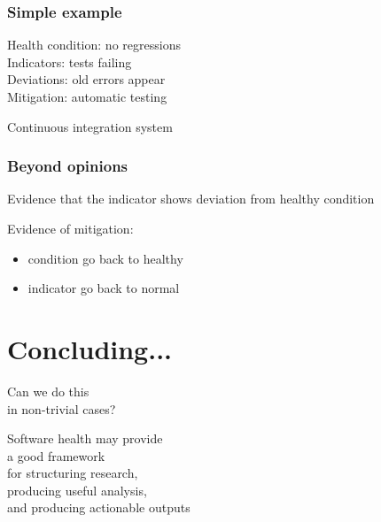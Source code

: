 \documentclass[17pt,aspectratio=169,hyperref=pdfusetitle]{beamer}
\begin{document}
\begin{frame}[fragile]
  \frametitle{Simple example}

  Health condition: no regressions \\
  Indicators: tests failing \\
  Deviations: old errors appear \\
  Mitigation: automatic testing \\

  \begin{center}
    Continuous integration system
  \end{center}
\end{frame}

\begin{frame}[fragile]
  \frametitle{Beyond opinions}

  Evidence that the indicator shows
  deviation from healthy condition

  \vspace{.5cm}
  
  Evidence of mitigation:

  \begin{itemize}
  \item condition go back to healthy
  \item indicator go back to normal
  \end{itemize}
  
\end{frame}

\section{Concluding...}

\begin{frame}[fragile]

  {\Large
  \begin{center}
    Can we do this \\
    in non-trivial cases?
  \end{center}
  }
  
\end{frame}

\begin{frame}[fragile]

  {\large
  \begin{center}
    Software health may provide \\
    a good framework \\
    for structuring research, \\
    producing useful analysis, \\
    and producing actionable outputs \\
  \end{center}
  }  
\end{frame}
\end{document}
